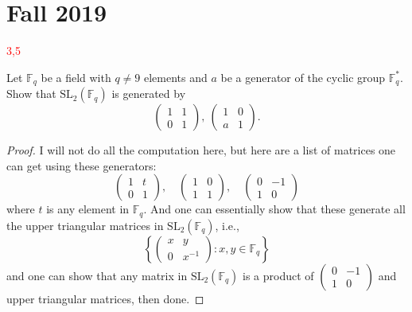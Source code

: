 \documentclass[openany]{book}
\newcommand{\F}{\mathbb{F}}
\begin{document}
\chapter{Fall 2019}

\textcolor{red}{3,5}

\begin{prob}
    Let \(\mathbb{F}_{q}\) be a field with \(q\neq 9\) elements and \(a\) be a generator of the cyclic group \(\mathbb{F}^{*}_{q}\). Show that \(\mathrm{SL}_{2}(\mathbb{F}_{q})\) is generated by
    \[\left(\begin{array}{cc}1&1\\0&1\end{array}\right),\ \left(\begin{array}{cc}1&0\\a&1\end{array}\right).\]
\end{prob}
\begin{proof}
    I will not do all the computation here, but here are a list of matrices one can get using these generators:
    \begin{equation*}
        \begin{pmatrix}
            1&t\\
            0&1
        \end{pmatrix}, \quad \begin{pmatrix}
            1&0\\
            1&1
        \end{pmatrix},\quad \begin{pmatrix}
            0&-1\\
            1&0
        \end{pmatrix}
    \end{equation*}
    where $t$ is any element in $\F_q$. And one can essentially show that these generate all the upper triangular matrices in $\text{SL}_2(\F_q)$, i.e.,
    \begin{equation*}
        \left\{\begin{pmatrix}
            x&y\\
            0&x^{-1}
        \end{pmatrix}: x,y\in\F_q\right\}
    \end{equation*}
    and one can show that any matrix in $\text{SL}_2(\F_q)$ is a product of $\begin{pmatrix}
        0&-1\\
        1&0
        \end{pmatrix} $ and upper triangular matrices, then done.
\end{proof}
\end{document}
